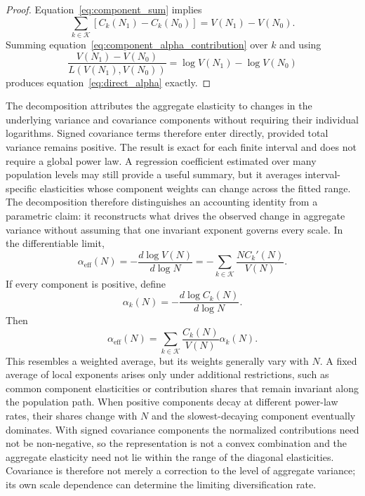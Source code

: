 \documentclass[a4paper,fleqn]{cas-dc}
\begin{document}
\begin{proof}
Equation~\eqref{eq:component_sum} implies
\begin{equation}
    \sum_{k\in\mathcal{K}}
    \left[C_k(N_1)-C_k(N_0)\right]
    =V(N_1)-V(N_0).
\end{equation}
Summing equation~\eqref{eq:component_alpha_contribution} over $k$ and
using
\begin{equation}
    \frac{V(N_1)-V(N_0)}{L(V(N_1),V(N_0))}
    =\log V(N_1)-\log V(N_0)
\end{equation}
produces equation~\eqref{eq:direct_alpha} exactly.
\end{proof}

The decomposition attributes the aggregate elasticity to changes in the
underlying variance and covariance components without requiring their
individual logarithms. Signed covariance terms therefore enter directly,
provided total variance remains positive. The result is exact for each
finite interval and does not require a global power law. A regression
coefficient estimated over many population levels may still provide a
useful summary, but it averages interval-specific elasticities whose
component weights can change across the fitted range. The decomposition
therefore distinguishes an accounting identity from a parametric claim:
it reconstructs what drives the observed change in aggregate variance
without assuming that one invariant exponent governs every scale. In the
differentiable limit,
\begin{equation}
\label{eq:local_signed_decomposition}
    \alpha_{\mathrm{eff}}(N)
    =-
    \frac{d\log V(N)}{d\log N}
    =-
    \sum_{k\in\mathcal{K}}
    \frac{N C_k'(N)}{V(N)}.
\end{equation}
If every component is positive, define
\begin{equation}
    \alpha_k(N)
    =
    -\frac{d\log C_k(N)}{d\log N}.
\end{equation}
Then
\begin{equation}
\label{eq:weighted_local_alpha}
    \alpha_{\mathrm{eff}}(N)
    =
    \sum_{k\in\mathcal{K}}
    \frac{C_k(N)}{V(N)}\alpha_k(N).
\end{equation}
This resembles a weighted average, but its weights generally vary with
$N$. A fixed average of local exponents arises only under additional
restrictions, such as common component elasticities or contribution
shares that remain invariant along the population path. When positive
components decay at different power-law rates, their shares change with
$N$ and the slowest-decaying component eventually dominates. With signed
covariance components the normalized contributions need not be
non-negative, so the representation is not a convex combination and the
aggregate elasticity need not lie within the range of the diagonal
elasticities. Covariance is therefore not merely a correction to the
level of aggregate variance; its own scale dependence can determine the
limiting diversification rate.
\end{document}
